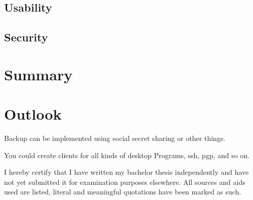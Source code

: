 \documentclass[12pt,oneside,a4paper,parskip]{scrbook}
\begin{document}
\section{Usability}

\section{Security}



\chapter{Summary}

\chapter{Outlook}

Backup can be implemented using social secret sharing or other things.

You could create clients for all kinds of desktop Programs, ssh, pgp, and so on.

\backmatter

\listoffigures
{}

\listoftables


\cleardoublepage
{}
{}
\printbibliography



I hereby certify that I have written my bachelor thesis independently and have not yet submitted it for examination purposes elsewhere. All sources and aids used are listed, literal and meaningful quotations have been marked as such.
\end{document}

